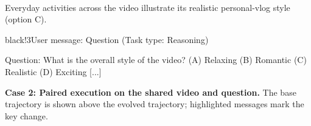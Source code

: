 \begin{center}
\begin{VideoStrip}
\hbox{\hskip2pt
\hskip2pt
\hskip2pt
}
\end{VideoStrip}
\noindent{}\hspace{2pt}%
\hspace{2pt}%
\hspace{2pt}%
\par
\fontsize{8}{9.5}\selectfont Everyday activities across the video illustrate its realistic personal-vlog style (option C).
\end{center}

\begin{MessageBox}{black!3}{User message: Question (Task type: Reasoning)}
\begin{Trajectory}
[...] Question: What is the overall style of the video?
(A) Relaxing  (B) Romantic  (C) Realistic  (D) Exciting [...]
\end{Trajectory}
\end{MessageBox}
\medskip
\noindent\textbf{Case 2: Paired execution on the shared video and question.}
The base trajectory is shown above the evolved trajectory; highlighted messages mark the key change.

